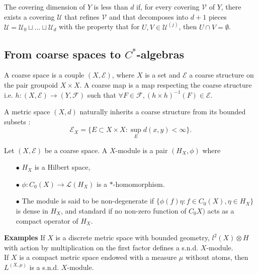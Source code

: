 \begin{definition}
The covering dimension of $Y$ is less than $d$ if, for every covering $\mathcal V$ of $Y$, there exists a covering $\mathcal U$ that refines $\mathcal V$ and that decomposes into $d+1$ pieces $\mathcal U = \mathcal U_0 \sqcup ... \sqcup \mathcal U_d$ with the property that for $U,V\in \mathcal U^{(j)}$, then $U\cap V=\emptyset$.
\end{definition}

\subsection{From coarse spaces to $C^*$-algebras}

\begin{definition}
A coarse space is a couple $(X,\mathcal E)$, where $X$ is a set and $\mathcal E$ a coarse structure on the pair groupoid $X\times X$. A coarse map is a map respecting the coarse structure i.e. $h : (X,\mathcal E)\rightarrow (Y,\mathcal F)$ such that $\forall F\in\mathcal F,(h\times h)^{-1}(F)\in \mathcal E$.
\end{definition}

A metric space $(X,d)$ naturally inherits a coarse structure from its bounded subsets :
\[\mathcal E_X = \{E\subset X\times X : \sup_{E} d(x,y)<\infty\}.\]

\begin{definition}
Let $(X,\mathcal E)$ be a coarse space. A $X$-module is a pair $(H_X,\phi )$ where 
\begin{itemize}
\item[$\bullet$] $H_X$ is a Hilbert space, 
\item[$\bullet$] $\phi : C_0(X)\rightarrow \mathcal L(H_X)$ is a $*$-homomorphism.
\item[$\bullet$] The module is said to be non-degenerate if $\{\phi(f)\eta : f\in C_0(X),\eta\in H_X\}$ is dense in $H_X$, and standard if no non-zero function of $C_0X)$ acts as a compact operator of $H_X$.
\end{itemize}
\end{definition}

\textbf{Examples} If $X$ is a discrete metric space with bounded geometry, $l^2(X)\otimes H$ with action by multiplication on the first factor defines a s.n.d. $X$-module.\\
If $X$ is a compact metric space endowed with a measure $\mu$ without atoms, then $L^(X,\mu)$ is a s.n.d. $X$-module.\\

